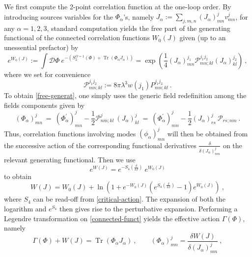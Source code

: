 \documentclass[a4paper,11pt,twoside]{article}
\numberwithin{equation}{section}
\DeclareMathOperator{\tr}{Tr}
\theoremstyle{nonumberplain}
\newcounter{and}
\begin{document}
We first compute the 2-point correlation function at the one-loop order. By introducing sources variables for the $\Phi_\alpha$'s, namely $J_\alpha := \underset{j,m,n}{\sum}(J_\alpha)^j_{mn}v^j_{mn}$, for any $\alpha=1,2,3$, standard computation yields the free part of the generating functional of the connected correlation functions $W_0(J)$ given (up to an unessential prefactor) by%
%
\begin{equation}
e^{W_0(J)} := \int\mathcal{D}\Phi \ e^{-(S_2^{\Omega=1}(\Phi)+\tr(\Phi_\alpha J_\alpha))} 
= \exp\left(\frac{1}{4} (J_\alpha)^{j_1}_{mn} \mathcal{P}^{j_1j_2}_{mn;kl} (J_\alpha)^{j_2}_{kl} \right) \ , \label{free-generat}
\end{equation}
%
where we set for convenience%
%
\begin{equation}
\mathcal{P}^{j_1j_2}_{mn;kl} := 8\pi\lambda^3 w(j_1) P^{j_1j_2}_{mn;kl} \ . \label{source}
\end{equation}
%
To obtain \eqref{free-generat}, one simply uses the generic field redefinition among the fields components given by%
%
\begin{equation*}
(\Phi_\alpha)^j_{mn} \ = \ (\Phi^\prime_\alpha)_{mn}^j - \frac12 \mathcal{P}^j_{nm;kl}\ (J_\alpha)^j_{kl} \ = \ (\Phi^\prime_\alpha)_{mn}^j - \frac12 (J_\alpha)^j_{rs} \ \mathcal{P}_{rs;nm} \ . 
\end{equation*}
%
Thus, correlation functions involving modes $(\phi_\alpha)^j_{mn}$ will then be obtained from the successive action of the corresponding functional derivatives $\frac{\delta}{\delta(J_\alpha)^j_{nm}}$ on the relevant generating functional. Then we use%
%
\begin{equation*}
e^{W(J)} = e^{-S_4\left(\frac{\delta}{\delta{J}}\right)} \ e^{W_0(J)}
\end{equation*}
%
to obtain%
%
\begin{equation}
W(J) = W_0(J) + \ln\left( 1 + e^{-W_0(J)} \left( e^{S_4\left(\frac{\delta}{\delta{J}}\right)} - 1 \right) e^{W_0(J)} \right) \ , \label{connected-funct}
\end{equation}
%
where $S_4$ can be read-off from \eqref{critical-action}. The expansion of both the logarithm and $e^{S_4}$ then gives rise to the perturbative expansion. Performing a Legendre transformation on \eqref{connected-funct} yields the effective action $\Gamma(\Phi)$, namely%
%
\begin{equation}
\Gamma(\Phi) + W(J) = \tr\left( \Phi_\alpha J_\alpha \right) \ , \qquad (\Phi_\alpha)^j_{mn} = \frac{\delta W(J)}{\delta(J_\alpha)^j_{nm}} \ , \label{legendre}
\end{equation}
\end{document}
